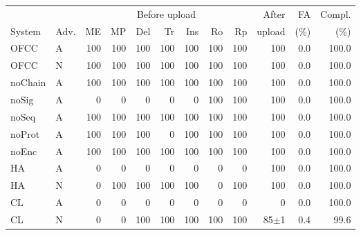 \begin{tabular}{@{}llrrrrrrrrrr@{}}
\toprule
 & & \multicolumn{7}{c}{Before upload} & After & FA & Compl. \\ \cmidrule(lr){3-9}
System & Adv. & ME & MP & Del & Tr & Ins & Ro & Rp & upload & (\%) & (\%) \\
\midrule
OFCC & A & 100 & 100 & 100 & 100 & 100 & 100 & 100 & 100 & 0.0 & 100.0 \\
OFCC & N & 100 & 100 & 100 & 100 & 100 & 100 & 100 & 100 & 0.0 & 100.0 \\
noChain & A & 100 & 100 & 100 & 100 & 100 & 100 & 100 & 100 & 0.0 & 100.0 \\
noSig & A & 0 & 0 & 0 & 0 & 0 & 100 & 100 & 100 & 0.0 & 100.0 \\
noSeq & A & 100 & 100 & 100 & 100 & 100 & 100 & 100 & 100 & 0.0 & 100.0 \\
noProt & A & 100 & 100 & 100 & 0 & 100 & 100 & 100 & 100 & 0.0 & 100.0 \\
noEnc & A & 100 & 100 & 100 & 100 & 100 & 100 & 100 & 100 & 0.0 & 100.0 \\
\midrule
HA & A & 0 & 0 & 0 & 0 & 0 & 0 & 0 & 100 & 0.0 & 100.0 \\
HA & N & 0 & 100 & 100 & 100 & 100 & 0 & 100 & 100 & 0.0 & 100.0 \\
CL & A & 0 & 0 & 0 & 0 & 0 & 0 & 0 & 0 & 0.0 & 100.0 \\
CL & N & 0 & 0 & 100 & 100 & 100 & 100 & 100 & 85$\pm$1 & 0.4 & 99.6 \\
\bottomrule
\end{tabular}
